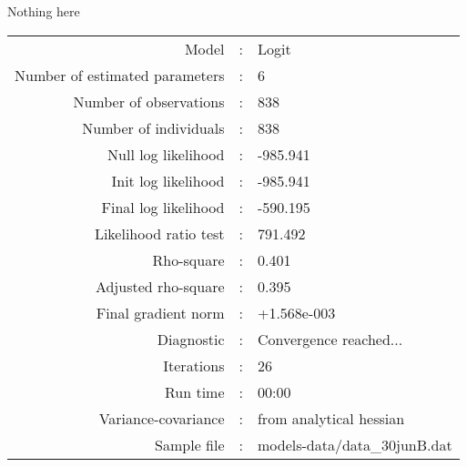 Nothing here\\


\begin{flushleft}
\begin{tabular}{rcl}
\hline
Model &:& Logit\\
Number of estimated parameters&:&6\\
Number of  observations &:& 838\\
Number of individuals&:&838\\
Null log likelihood&:&-985.941\\
Init log likelihood&:&-985.941\\
Final log likelihood&:&-590.195\\
Likelihood ratio test &:&791.492\\
Rho-square&:&0.401\\
Adjusted rho-square&:&0.395\\
Final gradient norm&:&+1.568e-003\\
Diagnostic&:&Convergence reached...\\
Iterations&:&26\\
Run time&:&00:00\\
Variance-covariance&:&from analytical hessian
\\
Sample file&:&models-data/data_30junB.dat\\
\end{tabular}
\end{flushleft}
